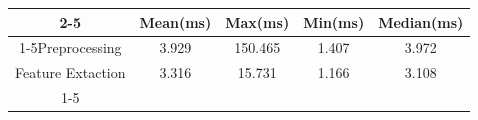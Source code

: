 \documentclass{standalone}
\begin{document}
 
 \begin{tabular}{|c |c |c |c |c |}
\cline{2-5}\cline{2-5} \multicolumn{1}{c |}{ } & Mean(ms) & Max(ms) & Min(ms) & Median(ms)\\ 
\cline{1-5}Preprocessing & 3.929 & 150.465 & 1.407 & 3.972\\ 
 \hhline{|=|=|=|=|=|}Feature Extaction & 3.316 & 15.731 & 1.166 & 3.108\\ 
 \cline{1-5}\hline \end{tabular}
 
\end{document}
